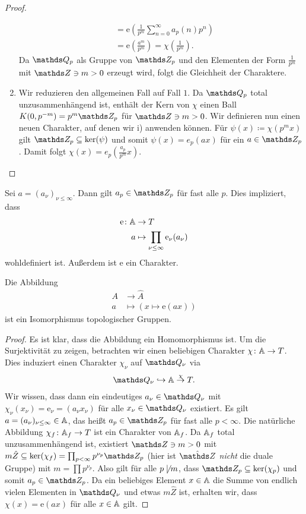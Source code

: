 \begin{proof}
\begin{enumerate}[label=\roman*)]
\begin{align*}
&=\mathrm{e}(\frac{1}{p^m}\sum_{n=0}^\infty a_p(n)p^n)\\
&=\mathrm{e}(\frac{a^m}{p^m})=\chi(\frac{1}{p^m}).
\end{align*}
Da $\Q_p$ als Gruppe von $\Z_p$ und den Elementen der Form $\frac{1}{p^m}$ mit $\Z \ni m>0$ erzeugt wird, folgt die Gleichheit der Charaktere.
\item Wir reduzieren den allgemeinen Fall auf Fall $1$.
Da $\Q_p$ total unzusammenhängend ist, enthält der Kern von $\chi$ einen Ball $K(0,p^{-m})=p^m \Z_p$ für $\Z \ni m>0$.
Wir definieren nun einen neuen Charakter, auf denen wir i) anwenden können.
Für $\psi(x)\coloneqq \chi(p^mx)$ gilt $\Z_p \subseteq \ker(\psi)$ und somit $\psi(x)=e_p(ax)$ für ein $a\in \Z_p$.
Damit folgt $\chi(x)=e_p(\frac{a_p}{p^m}x)$. \qedhere
\end{enumerate}
\end{proof}

Sei $a=(a_\nu)_{\nu \leq \infty}$. Dann gilt $a_p \in \Z_p$ für fast alle $p$.
Dies impliziert, dass
\begin{align*}
\mathrm{e}\colon \mathbb{A} &\to T\\
a &\mapsto \prod_{\nu \leq \infty} \mathrm{e}_\nu(a_\nu) 
\end{align*}
wohldefiniert ist. Außerdem ist $\mathrm{e}$ ein Charakter.

\begin{prop}
Die Abbildung
\begin{align*}
A &\to \hat{A}\\
a&\mapsto (x \mapsto \mathrm{e}(ax))
\end{align*}
ist ein Isomorphismus topologischer Gruppen.
\end{prop}
\begin{proof}
Es ist klar, dass die Abbildung ein Homomorphismus ist.
Um die Surjektivität zu zeigen, betrachten wir einen beliebigen Charakter $\chi \colon \mathbb{A} \to T$.
Dies induziert einen Charakter $\chi_\nu$ auf $\Q_\nu$ via
\begin{align*}
\Q_\nu \hookrightarrow \A \overset{\chi}{\to} T.
\end{align*}
Wir wissen, dass dann ein eindeutiges $a_\nu \in \Q_\nu$ mit $\chi_\nu(x_\nu)=\mathrm{e}_\nu=(a_\nu x_\nu)$ für alle $x_\nu \in \Q_\nu$ existiert.
Es gilt $a=(a_\nu)_{\nu \leq \infty}\in \mathbb{A}$, das heißt $a_p \in \Z_p$ für fast alle $p<\infty$.
Die natürliche Abbildung $\chi_f \colon \mathbb{A}_f \to T$ ist ein Charakter von $\mathbb{A}_f$.
Da $\mathbb{A}_f$ total unzusammenhängend ist, existiert $\Z \ni m >0$ mit
$m \hat{Z} \subseteq \ker(\chi_f)=\prod_{p<\infty} p^{\nu_p} \Z_p$ (hier ist $\hat{\Z}$ \emph{nicht} die duale Gruppe) mit $m=\prod p^{\nu_p}$.
Also gilt für alle $p \not \mid m$, dass $\Z_p \subseteq \ker(\chi_p)$ und somit $a_p \in \Z_p$.
Da ein beliebiges Element $x\in \mathbb{A}$ die Summe von endlich vielen Elementen in $\Q_\nu$ und etwas $m\hat{Z}$ ist, erhalten wir, dass $\chi(x)=\mathrm{e}(ax)$ für alle $x\in \mathbb{A}$ gilt.
\end{proof}

